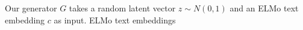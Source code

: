 Our generator $G$ takes a random latent vector $z \sim N(0, 1)$ and an ELMo text embedding $c$ as input. ELMo text embeddings